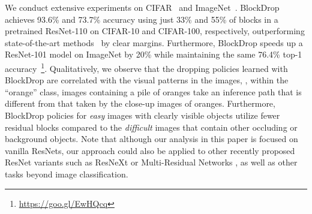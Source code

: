 \documentclass[10pt,twocolumn,letterpaper]{article}
\newcommand{\system}{BlockDrop\xspace}
\begin{document}
We conduct extensive experiments on CIFAR~\cite{krizhevsky2009learning} and ImageNet~\cite{deng2009imagenet}.
\system achieves 93.6\% and 73.7\% accuracy using just 33\% and 55\% of blocks in a pretrained ResNet-110 on CIFAR-10 and CIFAR-100, respectively, outperforming state-of-the-art methods~\cite{figurnov2017spatially,graves2016adaptive,dong2017more,li2016pruning} by clear margins. Furthermore, \system speeds up a ResNet-101 model on ImageNet by 20\% while maintaining the same 76.4\% top-1 accuracy~\footnote{\url{https://goo.gl/EwHQcq}}. 
Qualitatively, we observe that the dropping policies learned with \system are correlated with the visual patterns in the images, \eg, within the ``orange'' class, images containing a pile of oranges take an inference path that is different from that taken by the close-up images of oranges. Furthermore, \system policies for \emph{easy} images with clearly visible objects utilize fewer residual blocks compared to the \emph{difficult} images that contain other occluding or background objects.  
Note that although our analysis in this paper is focused on vanilla ResNets, our approach could also be applied to other recently proposed ResNet variants such as ResNeXt \cite{xie2017aggregated} or Multi-Residual Networks \cite{abdi2016multi}, as well as other tasks beyond image classification.
\end{document}
